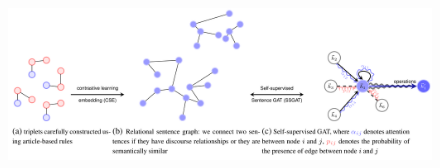 \begin{figure}[!htbp]\centering
\includegraphics[width=\linewidth]{img/multictx.PNG}
      
      
      
      

\end{figure}
